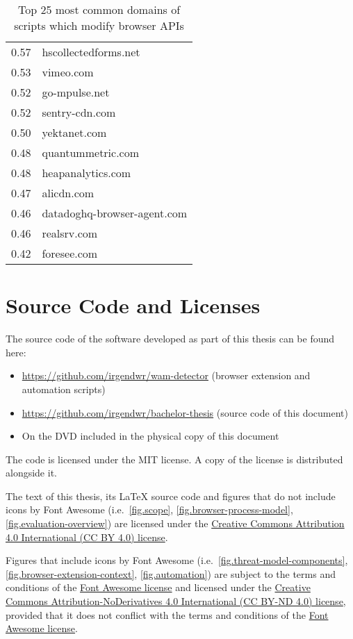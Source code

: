 \begin{appendices}
\begin{landscape}
\begin{table}
{\begin{tabular}{|r|l|}
         0.57 & hscollectedforms.net\\
         0.53 & vimeo.com\\
         0.52 & go-mpulse.net\\
         0.52 & sentry-cdn.com\\
         0.50 & yektanet.com\\
         0.48 & quantummetric.com\\
         0.48 & heapanalytics.com\\
         0.47 & alicdn.com\\
         0.46 & datadoghq-browser-agent.com\\
         0.46 & realsrv.com\\
         0.42 & foresee.com\\
        \hline
        \end{tabular}
        \caption{Top 25 most common domains of scripts which modify browser APIs}
        \label{tab.modifying-domains}
    }

    \end{table}

\end{landscape}

\chapter{Source Code and Licenses}

The source code of the software developed as part of this thesis can be found here:

\begin{itemize}
	\item \url{https://github.com/irgendwr/wam-detector} (browser extension and automation scripts)
	\item \url{https://github.com/irgendwr/bachelor-thesis} (source code of this document)
	\item On the DVD included in the physical copy of this document
\end{itemize}

The code is licensed under the MIT license. A copy of the license is distributed alongside it.

The text of this thesis, its \LaTeX{} source code and figures that do not include icons by Font Awesome (i.e.~\ref{fig.scope}, \ref{fig.browser-process-model}, \ref{fig.evaluation-overview}) are licensed under the \href{http://creativecommons.org/licenses/by/4.0/}{Creative Commons Attribution 4.0 International (CC BY 4.0) license}.

Figures that include icons by Font Awesome (i.e.~\ref{fig.threat-model-components}, \ref{fig.browser-extension-context}, \ref{fig.automation}) are subject to the terms and conditions of the \href{https://fontawesome.com/license}{Font Awesome license} and licensed under the \href{http://creativecommons.org/licenses/by-nd/4.0/}{Creative Commons Attribution-NoDerivatives 4.0 International (CC BY-ND 4.0) license}, provided that it does not conflict with the terms and conditions of the \href{https://fontawesome.com/license}{Font Awesome license}.

\end{appendices}
